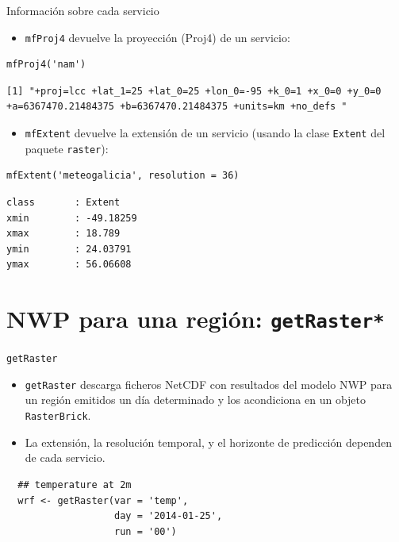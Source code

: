 \documentclass[xcolor={usenames,svgnames,dvipsnames}]{beamer}
\begin{document}
\begin{frame}[fragile,label=sec-2-3]{Información sobre cada servicio}
 \begin{itemize}
\item \texttt{mfProj4} devuelve la proyección (Proj4) de un servicio:
\end{itemize}
\lstset{language=R,label= ,caption= ,numbers=none}
\begin{lstlisting}
mfProj4('nam')
\end{lstlisting}

\begin{verbatim}
[1] "+proj=lcc +lat_1=25 +lat_0=25 +lon_0=-95 +k_0=1 +x_0=0 +y_0=0 +a=6367470.21484375 +b=6367470.21484375 +units=km +no_defs "
\end{verbatim}

\begin{itemize}
\item \texttt{mfExtent} devuelve la extensión de un servicio (usando la clase \texttt{Extent} del paquete \texttt{raster}):
\end{itemize}
\lstset{language=R,label= ,caption= ,numbers=none}
\begin{lstlisting}
mfExtent('meteogalicia', resolution = 36)
\end{lstlisting}

\begin{verbatim}
class       : Extent 
xmin        : -49.18259 
xmax        : 18.789 
ymin        : 24.03791 
ymax        : 56.06608
\end{verbatim}
\end{frame}

\section{NWP para una región: \texttt{getRaster*}}
\label{sec-3}

\begin{frame}[fragile,label=sec-3-1]{\texttt{getRaster}}
 \begin{itemize}
\item \texttt{getRaster} descarga ficheros NetCDF con resultados del modelo NWP
para un región emitidos un día determinado y los acondiciona en un
objeto \texttt{RasterBrick}.
\item La extensión, la resolución temporal, y el horizonte de predicción
dependen de cada servicio.
\end{itemize}

\lstset{language=R,label= ,caption= ,numbers=none}
\begin{lstlisting}
  ## temperature at 2m
  wrf <- getRaster(var = 'temp',
                   day = '2014-01-25',
                   run = '00')
\end{lstlisting}
\end{frame}
\end{document}
